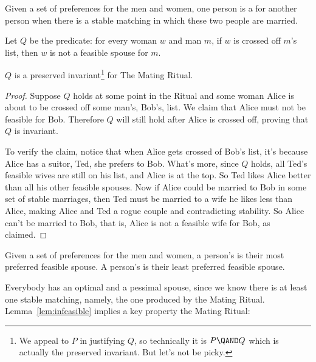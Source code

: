 \begin{definition}
Given a set of preferences for the men and women, one person is a
 for another person when there is a stable
matching in which these two people are married.
\end{definition}

\begin{definition}\label{infeasibleP}
Let $Q$ be the predicate: for every woman $w$ and man $m$, if
$w$ is crossed off $m$'s list, then $w$ is not a feasible spouse for $m$.
\end{definition}

\begin{lemma}\label{lem:infeasible}
  $Q$ is a preserved invariant\footnote{We appeal to $P$ in justifying
    $Q$, so technically it is $P \QAND Q$ which is actually the
    preserved invariant.  But let's not be picky.} for The Mating
  Ritual.

\end{lemma}

\begin{proof}
Suppose $Q$ holds at some point in the Ritual and some woman Alice
is about to be crossed off some man's, Bob's, list.  We claim that
Alice must not be feasible for Bob.  Therefore $Q$ will still hold
after Alice is crossed off, proving that $Q$ is invariant.

To verify the claim, notice that when Alice gets crossed of Bob's
list, it's because Alice has a suitor, Ted, she prefers to Bob.
What's more, since $Q$ holds, all Ted's feasible wives are still on
his list, and Alice is at the top.  So Ted likes Alice better than all
his other feasible spouses.  Now if Alice could be married to Bob in
some set of stable marriages, then Ted must be married to a wife he
likes less than Alice, making Alice and Ted a rogue couple and
contradicting stability.  So Alice can't be married to Bob, that is,
Alice is not a feasible wife for Bob, as claimed.
\end{proof}

\begin{definition}
Given a set of preferences for the men and women, a person's
 is their most preferred feasible spouse.  A
person's  is their least preferred feasible
spouse.
\end{definition}

Everybody has an optimal and a pessimal spouse, since we know there is
at least one stable matching, namely, the one produced by the Mating
Ritual.  Lemma~\ref{lem:infeasible} implies a key property the Mating
Ritual:

